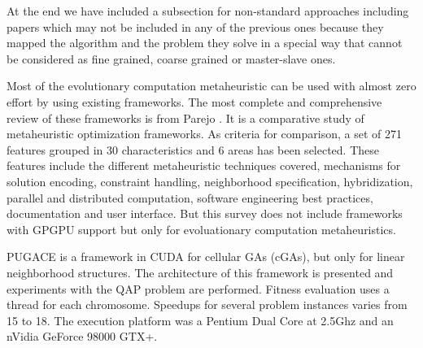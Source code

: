 \documentclass[prodmode,acmtecs]{acmsmall}
\begin{document}
At the end we have included a subsection for non-standard approaches \cite{DBLP:conf/gecco/PospichalMOSJ11} including  papers which may not be included in any of the previous ones because they mapped the algorithm and the problem they solve in a special way that cannot be considered as fine grained, coarse grained or master-slave ones.

 
Most of the evolutionary computation metaheuristic can be used with almost zero effort by using existing frameworks. The most complete and comprehensive review of these frameworks is from Parejo \cite{springerlink:10.1007/s00500-011-0754-8}. It is a comparative study of metaheuristic optimization frameworks. As criteria for comparison, a set of 271 features grouped in 30 characteristics and 6 areas has been selected. These features include the different metaheuristic techniques covered, mechanisms for solution encoding, constraint handling, neighborhood specification, hybridization, parallel and distributed computation, software engineering best practices, documentation and user interface. But this survey does not include frameworks with GPGPU support but only for evoluationary computation metaheuristics. 



PUGACE\cite{5586286} is a framework in CUDA for cellular GAs (cGAs), but only for linear neighborhood structures. The architecture of this framework is presented and experiments with the QAP problem are performed. Fitness evaluation uses a thread for each chromosome. Speedups for several problem instances varies from 15 to 18. The execution platform was a Pentium Dual Core at 2.5Ghz and an nVidia GeForce 98000 GTX+. %



\end{document}
